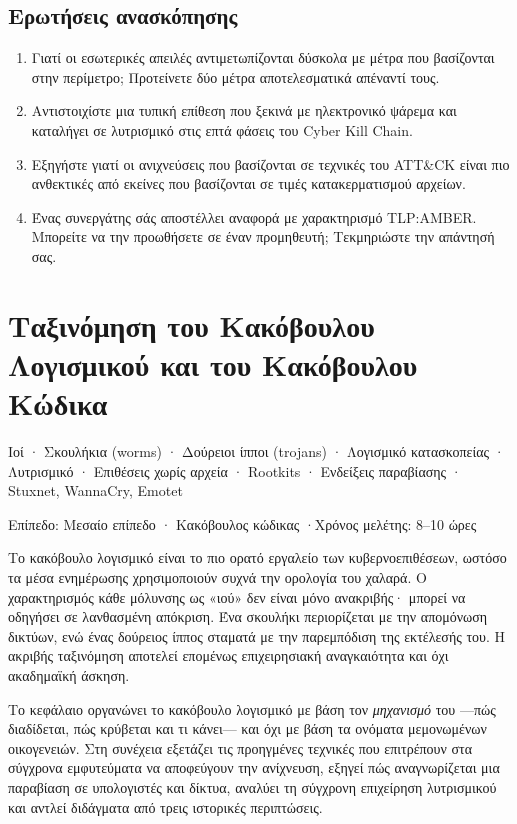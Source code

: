 \documentclass[11pt,openany]{book}
\newcommand{\chaptermeta}[3]{%
  {\sffamily\small\color{accent}#1\par}\vspace{0.3em}
  {\sffamily\footnotesize\color{gray}#2 \quad·\quad #3\par}\vspace{1.2em}}
\begin{document}
\section*{Ερωτήσεις ανασκόπησης}
\begin{enumerate}
  \item Γιατί οι εσωτερικές απειλές αντιμετωπίζονται δύσκολα με μέτρα που βασίζονται στην περίμετρο; Προτείνετε δύο μέτρα αποτελεσματικά απέναντί τους.
  \item Αντιστοιχίστε μια τυπική επίθεση που ξεκινά με ηλεκτρονικό ψάρεμα και καταλήγει σε λυτρισμικό στις επτά φάσεις του Cyber Kill Chain.
  \item Εξηγήστε γιατί οι ανιχνεύσεις που βασίζονται σε τεχνικές του ATT\&CK είναι πιο ανθεκτικές από εκείνες που βασίζονται σε τιμές κατακερματισμού αρχείων.
  \item Ένας συνεργάτης σάς αποστέλλει αναφορά με χαρακτηρισμό TLP:AMBER. Μπορείτε να την προωθήσετε σε έναν προμηθευτή; Τεκμηριώστε την απάντησή σας.
\end{enumerate}

\chapter{Ταξινόμηση του Κακόβουλου Λογισμικού και του Κακόβουλου Κώδικα}\label{ch:4}
\chaptermeta{Ιοί · Σκουλήκια (worms) · Δούρειοι ίπποι (trojans) · Λογισμικό κατασκοπείας · Λυτρισμικό · Επιθέσεις χωρίς αρχεία · Rootkits · Ενδείξεις παραβίασης · Stuxnet, WannaCry, Emotet}{Επίπεδο: Μεσαίο επίπεδο · Κακόβουλος κώδικας}{Χρόνος μελέτης: 8–10 ώρες}

Το κακόβουλο λογισμικό είναι το πιο ορατό εργαλείο των κυβερνοεπιθέσεων, ωστόσο τα μέσα ενημέρωσης χρησιμοποιούν συχνά την ορολογία του χαλαρά. Ο χαρακτηρισμός κάθε μόλυνσης ως «ιού» δεν είναι μόνο ανακριβής· μπορεί να οδηγήσει σε λανθασμένη απόκριση. Ένα σκουλήκι περιορίζεται με την απομόνωση δικτύων, ενώ ένας δούρειος ίππος σταματά με την παρεμπόδιση της εκτέλεσής του. Η ακριβής ταξινόμηση αποτελεί επομένως επιχειρησιακή αναγκαιότητα και όχι ακαδημαϊκή άσκηση.

Το κεφάλαιο οργανώνει το κακόβουλο λογισμικό με βάση τον \emph{μηχανισμό} του —πώς διαδίδεται, πώς κρύβεται και τι κάνει— και όχι με βάση τα ονόματα μεμονωμένων οικογενειών. Στη συνέχεια εξετάζει τις προηγμένες τεχνικές που επιτρέπουν στα σύγχρονα εμφυτεύματα να αποφεύγουν την ανίχνευση, εξηγεί πώς αναγνωρίζεται μια παραβίαση σε υπολογιστές και δίκτυα, αναλύει τη σύγχρονη επιχείρηση λυτρισμικού και αντλεί διδάγματα από τρεις ιστορικές περιπτώσεις.
\end{document}
